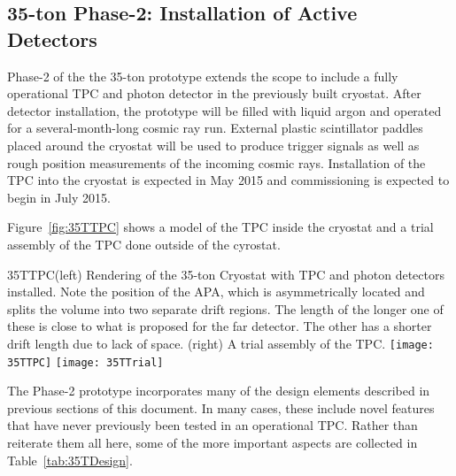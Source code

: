 \subsection{35-ton Phase-2: Installation of Active Detectors}
Phase-2 of the the 35-ton prototype extends the scope to include a fully operational TPC and
photon detector in the previously built cryostat.
After detector installation, the prototype will be filled with liquid argon and 
operated for a several-month-long cosmic ray run. 
External plastic scintillator paddles placed around the cryostat will be used to produce
trigger signals as well as rough position measurements of the incoming cosmic rays.
Installation of the TPC into the cryostat is expected in May 2015 and 
commissioning is expected to begin in July 2015.

Figure~\ref{fig:35TTPC} shows a model of the TPC inside the cryostat and a trial assembly of
the TPC done outside of the cyrostat. 

\begin{cdrfigure}{35TTPC}{(left) Rendering of the
35-ton Cryostat with TPC and photon detectors installed. 
Note the position of the APA, which is asymmetrically located and 
splits the volume into two separate drift regions.
The length of the longer one of these is close to what is proposed for the far detector. 
The other has a shorter drift length due to lack of space.
(right) A trial assembly of the TPC.
}
\texttt{[image: 35TTPC]}  
\texttt{[image: 35TTrial]}  
\end{cdrfigure}

The Phase-2 prototype incorporates many of the design elements described in previous
sections of this document.
In many cases, these include novel features that have never previously been tested
in an operational TPC.
Rather than reiterate them all here, some of the more important
aspects are collected in Table~\ref{tab:35TDesign}.

